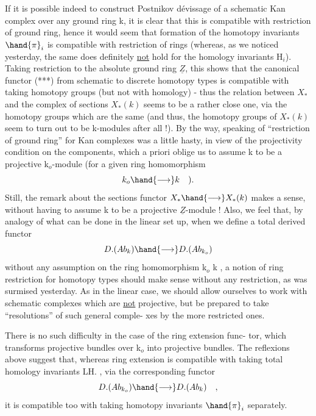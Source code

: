 
If it is possible indeed to construct Postnikov dévissage of a
 schematic Kan complex over any ground ring k, it is clear that this
is compatible with restriction of ground ring, hence it would seem that
formation of the homotopy  invariants $\hand{\pi}_i$ is compatible with 
restriction of rings\deleted{\unsure{,}} (whereas, as we noticed yesterday, the same does
definitely \uline{not} hold for the homology invariants H$_i$). Taking restriction
to the absolute ground ring $\underline{Z}$, this shows that the canonical functor
(***) from schematic to discrete homotopy types is compatible with
taking homotopy groups (but not with homology) - thus the relation
between $X_*$ and the complex of sections $X_*(k)$ seems to be a rather close
one, via the homotopy groups\hand{,} which are the same (and thus, the homotopy
groups of $X_*(k)$ seem to turn out to be k-modules after all !). By the
way, speaking of ``restriction of ground ring'' for Kan complexes was a
little hasty, in view of the projectivity condition on the components,
which a priori  oblige us to assume k to be a projective k$_o$-module
(for a given ring homomorphism
\[ k_o \hand{\longrightarrow} k \quad ) . \]
Still, the remark about the sections functor $X_* \hand{\longrightarrow} X_*(k)$ makes a
sense, without having to assume k to be a projective $\underline{Z}$-module ! Also,
we feel that, by analogy of what can be done in the linear set up,
when we define a total derived functor
\[ D.(Ab_k) \hand{\longrightarrow} D.(Ab_{k_o}) \]
without any assumption on the ring homomorphism k$_o$ \hand{$\to$} k , a notion of
ring restriction for  homotopy types should make sense without any
restriction, as was surmised yesterday. As in the linear case, we
should allow ourselves to work with schematic complexes which are \uline{not}
projective, but be prepared to take ``resolutions''  of such general comple-%
xes by the more restricted ones. 

There is no such difficulty in the case of the ring extension func-%
tor, which transforms projective bundles over k$_o$ into projective bundles.
The reflexions above suggest that, whereas ring extension is compatible
with taking total homology invariants LH. , via the corresponding
functor
\[ D.(Ab_{k_o}) \hand{\longrightarrow} D.(Ab_k) \quad , \]
it is compatible too with taking homotopy invariants $\hand{\pi}_i$ separately.

